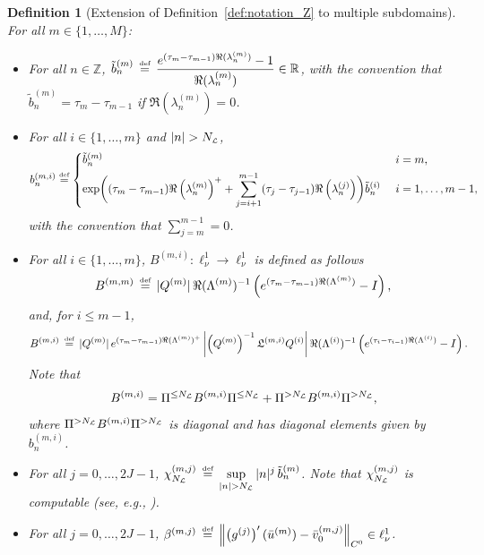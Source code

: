 \documentclass[10pt,a4paper]{article}
\theoremstyle{plain}
\newtheorem{definition}[theorem]{Definition}
\newcommand{\RR}{\mathbb R}
\newcommand{\ZZ}{\mathbb Z}
\renewcommand{\L}{\mathcal{L}}
\newcommand{\bu}{\bar{u}}
\newcommand{\kL}{\mathfrak{L}}
\newcommand{\tb}{\tilde{b}}
\newcommand{\1}{\mathbf{1}}
\newcommand{\bydef}{\,\stackrel{\mbox{\tiny\textnormal{\raisebox{0ex}[0ex][0ex]{def}}}}{=}\,}
\newcommand{\NL}{N_{\text{\tiny{$\L$}}}}
\begin{document}
\begin{definition}[Extension of Definition~\ref{def:notation_Z} to multiple subdomains]
\label{def:notation_Zmi}
For all $m\in\{1,\ldots,M\}$:
\begin{itemize}
\item For all $n\in\ZZ$, $\tb^{(m)}_n \bydef \dfrac{e^{(\tau_m-\tau_{m-1}) \Re(\lambda^{(m)}_n)}-1}{\Re(\lambda^{(m)}_n)}\in\RR$, with the convention that $\tb^{(m)}_n = \tau_m-\tau_{m-1}$ if $\Re(\lambda^{(m)}_n) = 0$.
\item For all $i\in\{1,\ldots,m\}$ and $\vert n\vert > \NL$,
\begin{align*}
b^{(m,i)}_n \!\bydef\! \left\{
\begin{aligned}
&\tb^{(m)}_n  && ~ i=m,\\
& \! \exp\biggl((\tau_m-\tau_{m-1}) \Re\left(\lambda_n^{(m)}\right)^+ + \sum_{j=i+1}^{m-1}(\tau_j-\tau_{j-1})\Re\left(\lambda_n^{(j)}\right)\biggr) \tb^{(i)}_n  && ~ i=1,\ldots,m-1,
\end{aligned}
\right.
\end{align*}
with the convention that $\sum_{j=m}^{m-1}=0$.
\item For all $i\in\{1,\ldots,m\}$, $B^{(m,i)}:\ell^1_\nu \to \ell^1_\nu$ is defined as follows
\begin{align*}
B^{(m,m)} \bydef \vert Q^{(m)}\vert\, \Re(\Lambda^{(m)})^{-1} \left(e^{(\tau_m-\tau_{m-1}) \Re(\Lambda^{(m)})} - I\right) ,
\end{align*} 
and, for $i\leq m-1$,
\begin{align*}
B^{(m,i)} &\bydef \vert Q^{(m)}\vert\, e^{(\tau_m-\tau_{m-1}) \Re(\Lambda^{(m)})^+} \left\vert \left(Q^{(m)}\right)^{-1} \kL^{(m,i)}  Q^{(i)} \right\vert 
 \Re(\Lambda^{(i)})^{-1} \left(e^{(\tau_i-\tau_{i-1}) \Re(\Lambda^{(i)})} - I\right) .
\end{align*}   
Note that
\begin{align*}
B^{(m,i)} = \Pi^{\leq \NL} B^{(m,i)} \Pi^{\leq \NL} + \Pi^{> \NL} B^{(m,i)} \Pi^{> \NL},
\end{align*}
where $\Pi^{> \NL} B^{(m,i)} \Pi^{> \NL}$ is diagonal and has diagonal elements given by $b^{(m,i)}_n$.
\item For all $j=0,\ldots,2J-1$, $\chi^{(m,j)}_{\NL} \bydef \sup\limits_{\vert n\vert >\NL} \vert n\vert^j\, \tilde{b}^{(m)}_n$. Note that $\chi^{(m,j)}_{\NL}$ is computable (see, e.g., \cite[Appendix D]{BerBreShe24}). 
\item For all $j=0,\ldots,2J-1$, $\beta^{(m,j)} \bydef \left\Vert\left(g^{(j)}\right)'(\bu^{(m)}) - \bar{v}_0^{(m,j)} \right\Vert_{C^0} \in \ell^1_\nu$.

\end{itemize}
\end{definition}
\end{document}
